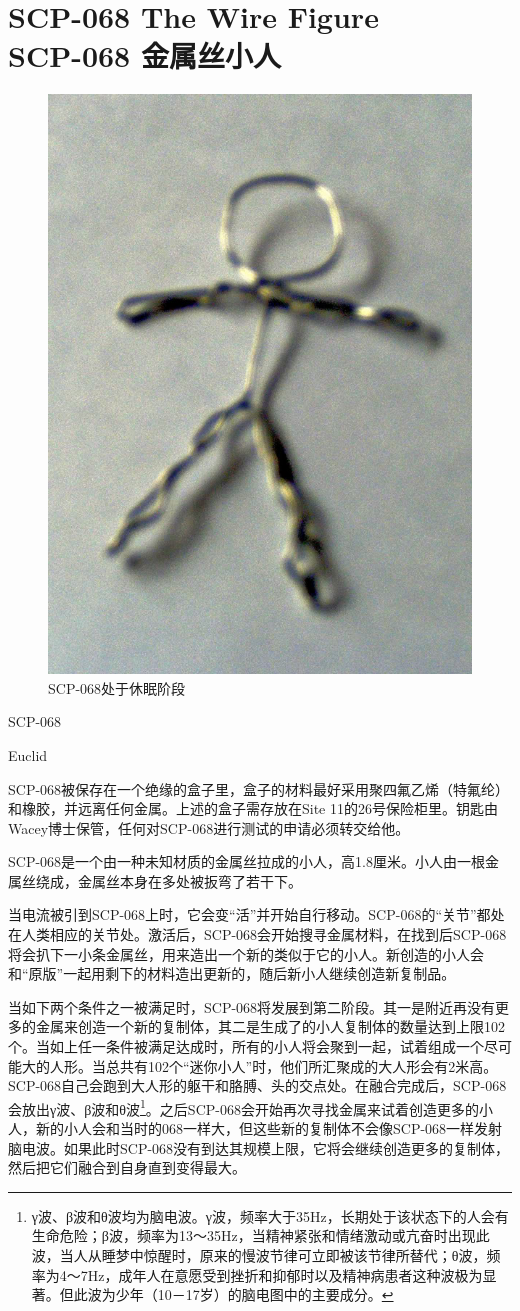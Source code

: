 \chapter[SCP-068 金属丝小人]{
    SCP-068 The Wire Figure\\
    SCP-068 金属丝小人
}

\label{chap:SCP-068}

\begin{figure}[H]
    \centering
    \includegraphics[width=0.4\linewidth]{images/SCP.068.jpg}
    \caption*{SCP-068处于休眠阶段}
\end{figure}

SCP-068

Euclid

SCP-068被保存在一个绝缘的盒子里，盒子的材料最好采用聚四氟乙烯（特氟纶）和橡胶，并远离任何金属。上述的盒子需存放在Site 11的26号保险柜里。钥匙由Wacey博士保管，任何对SCP-068进行测试的申请必须转交给他。

SCP-068是一个由一种未知材质的金属丝拉成的小人，高1.8厘米。小人由一根金属丝绕成，金属丝本身在多处被扳弯了若干下。

当电流被引到SCP-068上时，它会变“活”并开始自行移动。SCP-068的“关节”都处在人类相应的关节处。激活后，SCP-068会开始搜寻金属材料，在找到后SCP-068将会扒下一小条金属丝，用来造出一个新的类似于它的小人。新创造的小人会和“原版”一起用剩下的材料造出更新的，随后新小人继续创造新复制品。

当如下两个条件之一被满足时，SCP-068将发展到第二阶段。其一是附近再没有更多的金属来创造一个新的复制体，其二是生成了的小人复制体的数量达到上限102个。当如上任一条件被满足达成时，所有的小人将会聚到一起，试着组成一个尽可能大的人形。当总共有102个“迷你小人”时，他们所汇聚成的大人形会有2米高。SCP-068自己会跑到大人形的躯干和胳膊、头的交点处。在融合完成后，SCP-068会放出γ波、β波和θ波\footnote{γ波、β波和θ波均为脑电波。γ波，频率大于35Hz，长期处于该状态下的人会有生命危险；β波，频率为13～35Hz，当精神紧张和情绪激动或亢奋时出现此波，当人从睡梦中惊醒时，原来的慢波节律可立即被该节律所替代；θ波，频率为4～7Hz，成年人在意愿受到挫折和抑郁时以及精神病患者这种波极为显著。但此波为少年（10－17岁）的脑电图中的主要成分。}。之后SCP-068会开始再次寻找金属来试着创造更多的小人，新的小人会和当时的068一样大，但这些新的复制体不会像SCP-068一样发射脑电波。如果此时SCP-068没有到达其规模上限，它将会继续创造更多的复制体，然后把它们融合到自身直到变得最大。

